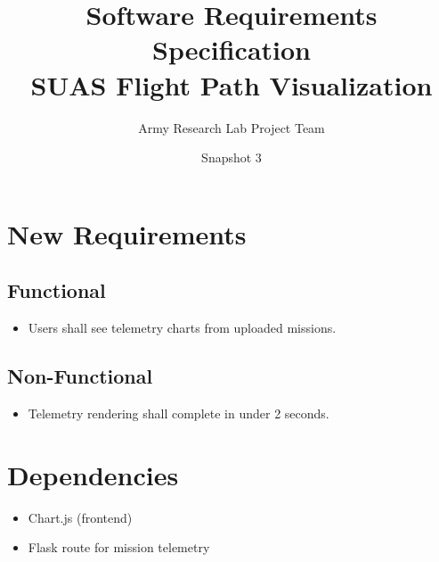 \documentclass[12pt]{article}
\title{Software Requirements Specification\\SUAS Flight Path Visualization}
\author{Army Research Lab Project Team}
\date{Snapshot 3}
\begin{document}
\maketitle

\tableofcontents
\newpage

\section{New Requirements}
\subsection{Functional}
\begin{itemize}
  \item Users shall see telemetry charts from uploaded missions.
\end{itemize}

\subsection{Non-Functional}
\begin{itemize}
  \item Telemetry rendering shall complete in under 2 seconds.
\end{itemize}

\section{Dependencies}
\begin{itemize}
  \item Chart.js (frontend)
  \item Flask route for mission telemetry
\end{itemize}
\end{document}
